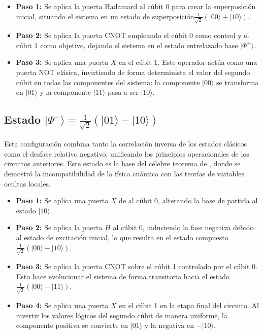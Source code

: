 \documentclass[11pt,a4paper,spanish]{book}
\begin{document}
\begin{itemize}
    \item \textbf{Paso 1:} Se aplica la puerta Hadamard \citep{deutsch1992} al cúbit 0 para crear la superposición inicial, situando el sistema en un estado de superposición$\frac{1}{\sqrt{2}}(\lvert00\rangle + \lvert10\rangle)$.
    \item \textbf{Paso 2:} Se aplica la puerta CNOT \citep{barenco1995} empleando el cúbit 0 como control y el cúbit 1 como objetivo, dejando el sistema en el estado entrelazado base $\lvert\Phi^+\rangle$.
    \item \textbf{Paso 3:} Se aplica una puerta $X$ \citep{pauli1927} en el cúbit 1. Este operador actúa como una puerta NOT clásica, invirtiendo de forma determinista el valor del segundo cúbit en todas las componentes del sistema: la componente $\lvert00\rangle$ se transforma en $\lvert01\rangle$ y la componente $\lvert11\rangle$ pasa a ser $\lvert10\rangle$.
\end{itemize}

\subsection{Estado $\lvert\Psi^-\rangle = \frac{1}{\sqrt{2}}(\lvert01\rangle - \lvert10\rangle)$}
Esta configuración combina tanto la correlación inversa de los estados clásicos como el desfase relativo negativo, unificando los principios operacionales de los circuitos anteriores. Este estado es la base del célebre teorema de \cite{bell1964}, donde se demostró la incompatibilidad de la física cuántica con las teorías de variables ocultas locales.

\begin{itemize}
    \item \textbf{Paso 1:} Se aplica una puerta $X$ de \cite{pauli1927}  al cúbit 0, alterando la base de partida al estado $\lvert10\rangle$.
    \item \textbf{Paso 2:} Se aplica la puerta $H$ \citep{deutsch1992} al cúbit 0, induciendo la fase negativa debido al estado de excitación inicial, lo que resulta en el estado compuesto $\frac{1}{\sqrt{2}}(\lvert00\rangle - \lvert10\rangle)$.
    \item \textbf{Paso 3:} Se aplica la puerta CNOT \citep{barenco1995} sobre el cúbit 1 controlado por el cúbit 0. Esto hace evolucionar el sistema de forma transitoria hacia el estado $\frac{1}{\sqrt{2}}(\lvert00\rangle - \lvert11\rangle)$.
    \item \textbf{Paso 4:} Se aplica una puerta $X$ en el cúbit 1 en la etapa final del circuito. Al invertir los valores lógicos del segundo cúbit de manera uniforme, la componente positiva se convierte en $\lvert01\rangle$ y la negativa en $-\lvert10\rangle$.
\end{itemize}
\end{document}
